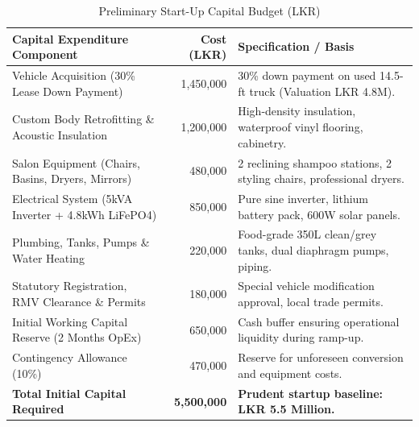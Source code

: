 \begin{table}[htbp]
\centering
\small
\caption{Preliminary Start-Up Capital Budget (LKR)}
\label{tab:prelim_capex}
\begin{tabularx}{\textwidth}{L{0.45\textwidth}rY}
\toprule
\textbf{Capital Expenditure Component} & \textbf{Cost (LKR)} & \textbf{Specification / Basis} \\
\midrule
Vehicle Acquisition (30\% Lease Down Payment) & 1,450,000 & 30\% down payment on used 14.5-ft truck (Valuation LKR 4.8M). \\
Custom Body Retrofitting \& Acoustic Insulation & 1,200,000 & High-density insulation, waterproof vinyl flooring, cabinetry. \\
Salon Equipment (Chairs, Basins, Dryers, Mirrors) & 480,000 & 2 reclining shampoo stations, 2 styling chairs, professional dryers. \\
Electrical System (5kVA Inverter + 4.8kWh LiFePO4) & 850,000 & Pure sine inverter, lithium battery pack, 600W solar panels. \\
Plumbing, Tanks, Pumps \& Water Heating & 220,000 & Food-grade 350L clean/grey tanks, dual diaphragm pumps, piping. \\
Statutory Registration, RMV Clearance \& Permits & 180,000 & Special vehicle modification approval, local trade permits. \\
Initial Working Capital Reserve (2 Months OpEx) & 650,000 & Cash buffer ensuring operational liquidity during ramp-up. \\
Contingency Allowance (10\%) & 470,000 & Reserve for unforeseen conversion and equipment costs. \\
\midrule
\textbf{Total Initial Capital Required} & \textbf{5,500,000} & \textbf{Prudent startup baseline: LKR 5.5 Million.} \\
\bottomrule
\end{tabularx}
\end{table}

